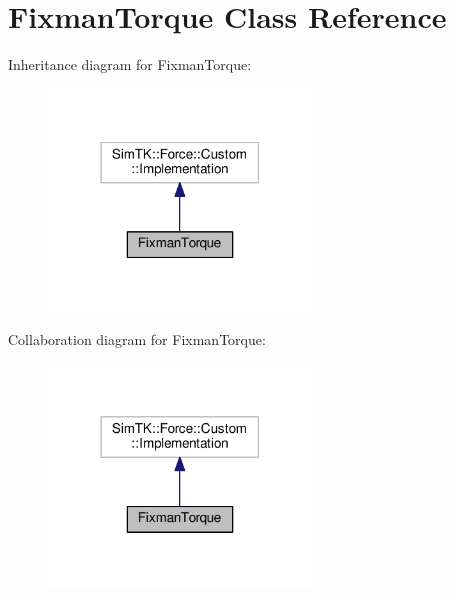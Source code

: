 \hypertarget{classFixmanTorque}{}\section{Fixman\+Torque Class Reference}
\label{classFixmanTorque}


Inheritance diagram for Fixman\+Torque\+:\nopagebreak
\begin{figure}[H]
\begin{center}
\leavevmode
\includegraphics[width=198pt]{classFixmanTorque__inherit__graph}
\end{center}
\end{figure}


Collaboration diagram for Fixman\+Torque\+:\nopagebreak
\begin{figure}[H]
\begin{center}
\leavevmode
\includegraphics[width=198pt]{classFixmanTorque__coll__graph}
\end{center}
\end{figure}
